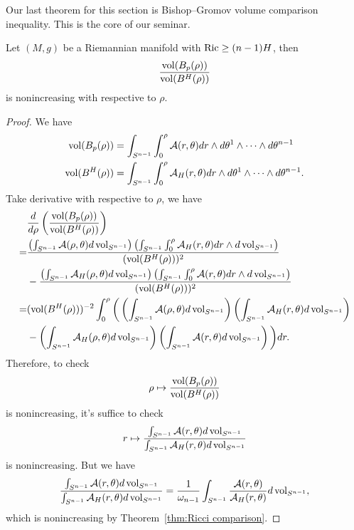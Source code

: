 Our last theorem for this section is Bishop--Gromov volume comparison inequality.
This is the core of our seminar.
\begin{thm}
    Let $(M,g)$ be a Riemannian manifold with $\operatorname{Ric}\geq(n-1)H$, then
    \[\frac{\operatorname{vol}(B_p(\rho))}{\operatorname{vol}(B^H(\rho))}\]
    is nonincreasing with respective to $\rho$.
\end{thm}
\begin{proof}
    We have
    \begin{align*}
        \operatorname{vol}(B_p(\rho))&=\int_{S^{n-1}}\int_0^\rho\mathcal{A}(r,\theta)dr\wedge d\theta^1\wedge\cdots\wedge d\theta^{n-1}\\
        \operatorname{vol}(B^H(\rho))&=\int_{S^{n-1}}\int_0^\rho\mathcal{A}_H(r,\theta)dr\wedge d\theta^1\wedge\cdots\wedge d\theta^{n-1}.
    \end{align*}
    Take derivative with respective to $\rho$, we have
    \begin{align*}
        &\frac{d}{d\rho}\left(\frac{\operatorname{vol}(B_p(\rho))}{\operatorname{vol}(B^H(\rho))}\right)\\
        =&\frac{\left(\int_{S^{n-1}}\mathcal{A}(\rho,\theta)d\operatorname{vol}_{S^{n-1}}\right)\left(\int_{S^{n-1}}\int_0^\rho\mathcal{A}_H(r,\theta)dr\wedge d\operatorname{vol}_{S^{n-1}}\right)}{(\operatorname{vol}(B^H(\rho)))^2}\\
        &-\frac{\left(\int_{S^{n-1}}\mathcal{A}_H(\rho,\theta)d\operatorname{vol}_{S^{n-1}}\right)\left(\int_{S^{n-1}}\int_0^\rho\mathcal{A}(r,\theta)dr\wedge d\operatorname{vol}_{S^{n-1}}\right)}{(\operatorname{vol}(B^H(\rho)))^2}\\
        =&(\operatorname{vol}(B^H(\rho)))^{-2}\int_0^\rho\bigg(\left(\int_{S^{n-1}}\mathcal{A}(\rho,\theta)d\operatorname{vol}_{S^{n-1}}\right)\left(\int_{S^{n-1}}\mathcal{A}_H(r,\theta)d\operatorname{vol}_{S^{n-1}}\right)\\
        &-\left(\int_{S^{n-1}}\mathcal{A}_H(\rho,\theta)d\operatorname{vol}_{S^{n-1}}\right)\left(\int_{S^{n-1}}\mathcal{A}(r,\theta)d\operatorname{vol}_{S^{n-1}}\right)\bigg)dr.
    \end{align*}
    Therefore, to check
    \[\rho\mapsto\frac{\operatorname{vol}(B_p(\rho))}{\operatorname{vol}(B^H(\rho))}\]
    is nonincreasing, it's suffice to check
    \[r\mapsto\frac{\int_{S^{n-1}}\mathcal{A}(r,\theta)d\operatorname{vol}_{S^{n-1}}}{\int_{S^{n-1}}\mathcal{A}_H(r,\theta)d\operatorname{vol}_{S^{n-1}}}\]
    is nonincreasing.
    But we have
    \[\frac{\int_{S^{n-1}}\mathcal{A}(r,\theta)d\operatorname{vol}_{S^{n-1}}}{\int_{S^{n-1}}\mathcal{A}_H(r,\theta)d\operatorname{vol}_{S^{n-1}}}=\frac{1}{\omega_{n-1}}\int_{S^{n-1}}\frac{\mathcal{A}(r,\theta)}{\mathcal{A}_H(r,\theta)}d\operatorname{vol}_{S^{n-1}},\]
    which is nonincreasing by Theorem~\ref{thm:Ricci comparison}.
\end{proof}

